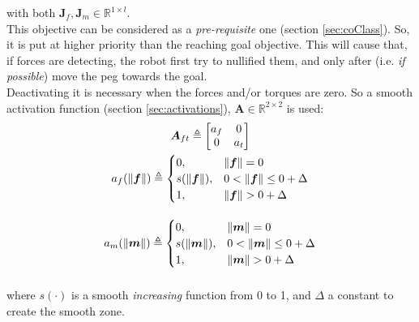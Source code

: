 with both $\boldsymbol{J}_f, \boldsymbol{J}_m \in \mathbb{R}^{1\times l}$.\\
This objective can be considered as a \textit{pre-requisite} one (section \ref{sec:coClass}). So, it is put at higher priority than the reaching goal objective. This will cause that, if forces are detecting, the robot first try to nullified them, and only after (i.e. \textit{if possible}) move the peg towards the goal.\\
Deactivating it is necessary when the forces and/or torques are zero. So a smooth activation function (section \ref{sec:activations}), $\boldsymbol{A} \in \mathbb{R}^{2 \times 2}$ is used:
\begin{equation}
	\begin{gathered}
		\boldsymbol{A}_{ft} \triangleq
		\begin{bmatrix}
			a_f & 0 \\
			0 & a_t \\
		\end{bmatrix} \\
		\vspace{10px}
		a_f(\| \boldsymbol{f}\|) \triangleq
		\begin{cases}
			0,& \| \boldsymbol{f}\| = 0\\
			s(\| \boldsymbol{f}\|), & 0 < \| \boldsymbol{f}\| \leq 0 + \Delta\\
			1, & \| \boldsymbol{f}\| > 0 + \Delta\\
		\end{cases} \\
		\vspace{10px}
		a_m(\| \boldsymbol{m}\|) \triangleq
		\begin{cases}
			0,& \| \boldsymbol{m}\| = 0\\
			s(\| \boldsymbol{m}\|), & 0 < \| \boldsymbol{m}\| \leq 0 + \Delta\\
			1, & \| \boldsymbol{m}\| > 0 + \Delta\\
		\end{cases}
	\end{gathered}
\end{equation}  
where $s(\cdot)$ is a smooth \textit{increasing} function from 0 to 1, and $\Delta$ a constant to create the smooth zone.





